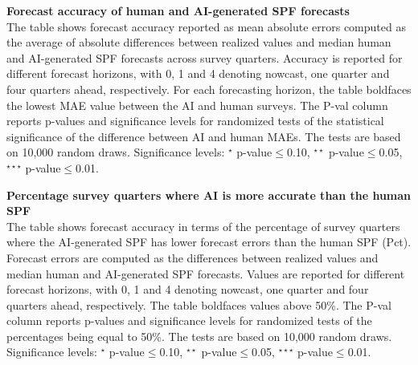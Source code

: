 \documentclass[11pt,letterpaper]{scrartcl}
\begin{document}

\begin{table}[h!]
    \centering
    \footnotesize{
    
    }
    \caption{
    \textbf{Forecast accuracy of human and AI-generated SPF forecasts}
    \vspace{5pt}\\
    \footnotesize{The table shows forecast accuracy reported as mean absolute errors computed as the average of absolute differences between realized values and median human and AI-generated SPF forecasts across survey quarters. Accuracy is reported for different forecast horizons, with 0, 1 and 4 denoting nowcast, one quarter and four quarters ahead, respectively. For each forecasting horizon, the table boldfaces the lowest MAE value between the AI and human surveys. The P-val column reports p-values and significance levels for randomized tests of the statistical significance of the difference between AI and human MAEs. The tests are based on 10,000 random draws. Significance levels: $^{\star}$ p-value$\leq$0.10, $^{\star\star}$ p-value$\leq$0.05, $^{\star\star\star}$ p-value$\leq$0.01.
}}
    \label{tab:forecastaccuracy_AI_SPF}
\end{table}
\clearpage


\begin{table}[h!]
    \centering
    \footnotesize{
    
    }
    \caption{
    \textbf{Percentage survey quarters where AI is more accurate than the human SPF}
    \vspace{5pt}\\
    \footnotesize{The table shows forecast accuracy in terms of the percentage of survey quarters where the AI-generated SPF has lower forecast errors than the human SPF (Pct). Forecast errors are computed as the differences between realized values and median human and AI-generated SPF forecasts. Values are reported for different forecast horizons, with 0, 1 and 4 denoting nowcast, one quarter and four quarters ahead, respectively. The table boldfaces values above 50\%. The P-val column reports p-values and significance levels for randomized tests of the percentages being equal to 50\%. The tests are based on 10,000 random draws. Significance levels: $^{\star}$ p-value$\leq$0.10, $^{\star\star}$ p-value$\leq$0.05, $^{\star\star\star}$ p-value$\leq$0.01.
}}
    \label{tab:forecastaccuracy_AI_SPF_numquarters}
\end{table}
\clearpage
\end{document}
